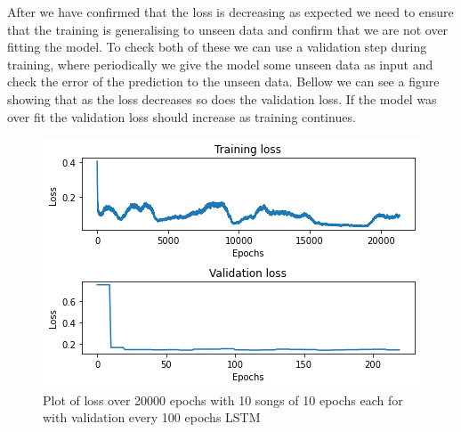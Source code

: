 \documentclass{article}
\begin{document}
After we have confirmed that the loss is decreasing as expected we need to ensure that the training is generalising to unseen data and confirm that we are not over fitting the model. To check both of these we can use a validation step during training, where periodically we give the model some unseen data as input and check the error of the prediction to the unseen data. Bellow we can see a figure showing that as the loss decreases so does the validation loss. If the model was over fit the validation loss should increase as training continues.
\begin{figure}[H]
\centering
\caption{Plot of loss over 20000 epochs with 10 songs of 10 epochs each for with validation every 100 epochs LSTM}
\includegraphics[scale=0.7]{validation.png}
\end{figure}
\end{document}
